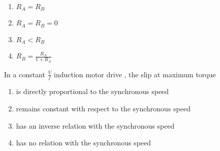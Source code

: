    \begin{multicols}{4}
       \begin{enumerate}
           \item $R_A = R_B$
           \item $R_A = R_B = 0$
           \item $R_A < R_B$
           \item $R_B = \frac{R_A}{1+R_A}$
       \end{enumerate}
       \end{multicols}
       \item In a constant $\frac{V}{f}$ induction motor drive , the slip at maximum torque
       \begin{enumerate}
           \item is directly proportional to the synchronous speed
           \item remains constant with respect to the synchronous speed
\item  has an inverse relation with the synchronous speed
\item has no relation with the synchronous speed
       \end{enumerate}

      
